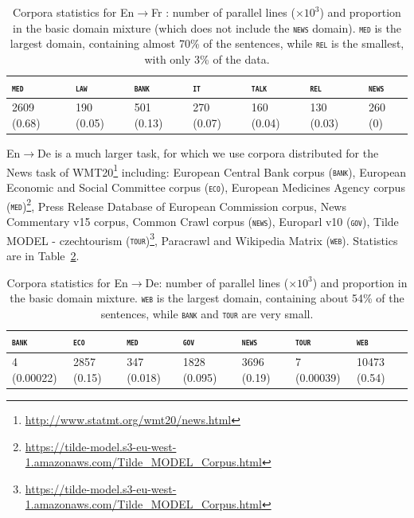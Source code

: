 \documentclass[11pt,a4paper]{article}
\newcommand{\domain}[1]{\texttt{\textsc{#1}}}
\begin{document}
\begin{table}[htbp]
  \centering
  \begin{tabular}{ |lllllll|} %
    \hline
    \domain{med} & \domain{law} & \domain{bank} & \domain{it} & \domain{talk} & \domain{rel} & \domain{news} \\
    \hline
    2609 (0.68) & 190 (0.05)  & 501 (0.13) & 270 (0.07) & 160 (0.04) & 130 (0.03) & 260 (0) \\
    \hline
  \end{tabular}
\caption{Corpora statistics for En$\rightarrow$Fr : number of parallel lines ($\times 10^3$) and proportion in the basic domain mixture (which does not include the \domain{news} domain). \domain{med} is the largest domain, containing almost 70\% of the sentences, while \domain{rel} is the smallest, with only 3\% of the data.}
\label{tab:Corpora-en-fr}
\end{table}

En$\rightarrow$De is a much larger task, for which we use corpora distributed for the News task of WMT20\footnote{\url{http://www.statmt.org/wmt20/news.html}} including: European Central Bank corpus (\domain{bank}),  European Economic and Social Committee corpus (\domain{eco}), European Medicines Agency corpus (\domain{med})\footnote{\url{https://tilde-model.s3-eu-west-1.amazonaws.com/Tilde_MODEL_Corpus.html}}, Press Release Database of European Commission corpus, News Commentary v15 corpus, Common Crawl corpus (\domain{news}), Europarl v10 (\domain{gov}), Tilde MODEL - czechtourism (\domain{tour})\footnote{\url{https://tilde-model.s3-eu-west-1.amazonaws.com/Tilde_MODEL_Corpus.html}}, Paracrawl and Wikipedia Matrix (\domain{web}). Statistics are in Table~\ref{tab:Corpora-en-de}.
\begin{table}[htbp]
  \centering
  \begin{tabular}{ |lllllll|} %
    \hline
    \domain{bank} & \domain{eco} & \domain{med} & \domain{gov} & \domain{news} & \domain{tour} & \domain{web} \\
    \hline
    4 (0.00022) & 2857 (0.15) & 347 (0.018) & 1828 (0.095) & 3696 (0.19) & 7 (0.00039) & 10473 (0.54) \\
    \hline
  \end{tabular}
\caption{Corpora statistics for En$\rightarrow$De: number of parallel lines ($\times 10^3$) and proportion in the basic domain mixture. \domain{web} is the largest domain, containing about 54\% of the sentences, while \domain{bank} and \domain{tour} are very small.}
\label{tab:Corpora-en-de}
\end{table}
\end{document}
